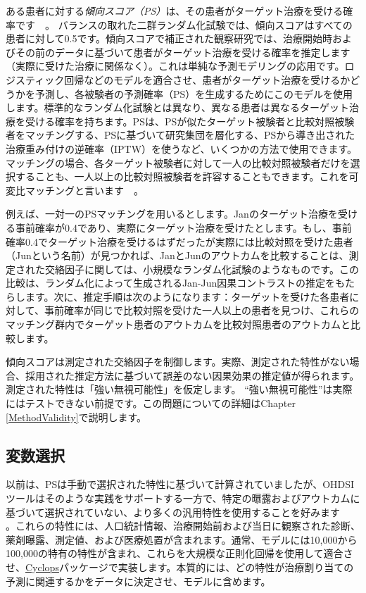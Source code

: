 \documentclass[
  11pt]{book}
\theoremstyle{definition}
\theoremstyle{definition}
\theoremstyle{definition}
\theoremstyle{definition}
\theoremstyle{remark}
\begin{document}
ある患者に対する\emph{傾向スコア（PS）}は、その患者がターゲット治療を受ける確率です　\citep[ ]{rosenbaum_1983}。 バランスの取れた二群ランダム化試験では、傾向スコアはすべての患者に対して0.5です。傾向スコアで補正された観察研究では、治療開始時およびその前のデータに基づいて患者がターゲット治療を受ける確率を推定します（実際に受けた治療に関係なく）。これは単純な予測モデリングの応用です。ロジスティック回帰などのモデルを適合させ、患者がターゲット治療を受けるかどうかを予測し、各被験者の予測確率（PS）を生成するためにこのモデルを使用します。標準的なランダム化試験とは異なり、異なる患者は異なるターゲット治療を受ける確率を持ちます。PSは、PSが似たターゲット被験者と比較対照被験者をマッチングする、PSに基づいて研究集団を層化する、PSから導き出された治療重み付けの逆確率（IPTW）を使うなど、いくつかの方法で使用できます。マッチングの場合、各ターゲット被験者に対して一人の比較対照被験者だけを選択することも、一人以上の比較対照被験者を許容することもできます。これを可変比マッチングと言います　\citep[ ]{rassen_2012}。      

例えば、一対一のPSマッチングを用いるとします。Janのターゲット治療を受ける事前確率が0.4であり、実際にターゲット治療を受けたとします。もし、事前確率0.4でターゲット治療を受けるはずだったが実際には比較対照を受けた患者（Junという名前）が見つかれば、JanとJunのアウトカムを比較することは、測定された交絡因子に関しては、小規模なランダム化試験のようなものです。この比較は、ランダム化によって生成されるJan-Jun因果コントラストの推定をもたらします。次に、推定手順は次のようになります：ターゲットを受けた各患者に対して、事前確率が同じで比較対照を受けた一人以上の患者を見つけ、これらのマッチング群内でターゲット患者のアウトカムを比較対照患者のアウトカムと比較します。

傾向スコアは測定された交絡因子を制御します。実際、測定された特性がない場合、採用された推定方法に基づいて誤差のない因果効果の推定値が得られます。測定された特性は「強い無視可能性」を仮定します。 ``強い無視可能性''は実際にはテストできない前提です。この問題についての詳細はChapter \ref{MethodValidity}で説明します。 

\subsection{変数選択}\label{VariableSelection}

以前は、PSは手動で選択された特性に基づいて計算されていましたが、OHDSIツールはそのような実践をサポートする一方で、特定の曝露およびアウトカムに基づいて選択されていない、より多くの汎用特性を使用することを好みます　\citep[ ]{tian_2018} 。これらの特性には、人口統計情報、治療開始前および当日に観察された診断、薬剤曝露、測定値、および医療処置が含まれます。通常、モデルには10,000から100,000の特有の特性が含まれ、これらを大規模な正則化回帰\citep[ ]{suchard_2013}を使用して適合させ、\href{https://ohdsi.github.io/Cyclops/}{Cyclops}パッケージで実装します。本質的には、どの特性が治療割り当ての予測に関連するかをデータに決定させ、モデルに含めます。
\end{document}
